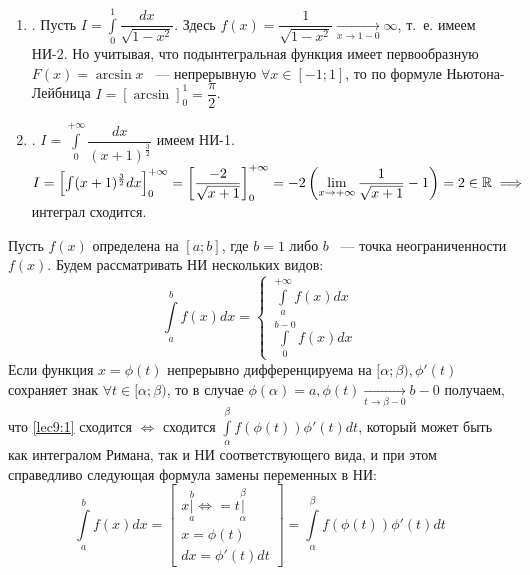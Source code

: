 \documentclass[../../main.tex]{subfiles}
\begin{document}
\begin{exmps}
\begin{enumerate}
	\item. Пусть $ I = \int\limits_{0}^1 \dfrac{dx}{\sqrt{1 - x^2}} $.
	Здесь $ f(x) = \dfrac{1}{\sqrt{1 - x^2}} \underset{x \to 1 - 0}{\to}
	\infty $, т.~е. имеем НИ-2. Но учитывая, что подынтегральная функция 
	имеет первообразную $ F(x) = \arcsin{x} $ ~--- непрерывную $ \forall x
	\in [-1; 1] $, то по формуле Ньютона-Лейбница $ 
	I = \left[\arcsin \right]_0^1 = \dfrac{\pi}{2} $.
	\item. $ I = \int\limits_{0}^{+\infty} \dfrac{dx}{(x + 1)^{\frac{3}{2}}}$
	имеем НИ-1. $ I = \left[ \int (x + 1)^{\frac{3}{2}} dx\right]_0^{+\infty} 
	= \left[ \dfrac{-2}{\sqrt{x + 1}} \right]_0^{+\infty} = -2 \left(
	\lim\limits_{x \to + \infty} \dfrac{1}{\sqrt{x + 1}} - 1 \right) = 2
	\in \mathbb{R} \implies $ интеграл сходится.
\end{enumerate}
\end{exmps}
\begin{thm}
	Пусть $ f(x) $ определена на $ [a; b] $, где $ b = 1 $ либо $ b $ ~---
	точка неограниченности $ f(x) $. %
	Будем рассматривать НИ нескольких видов:
	\begin{equation}
		\label{lec9:1}
		\int\limits_a^b f(x) dx = 
		\begin{cases}
			\int\limits_a^{+\infty} f(x) dx\\
			\int\limits_{0}^{b - 0} f(x) dx
		\end{cases}
	\end{equation}
	Если функция $ x = \phi(t) $ непрерывно дифференцируема на $ [\alpha; \beta)
	, \phi'(t) $ сохраняет знак $ \forall t \in [\alpha; \beta) $, то
	в случае $ \phi(\alpha) = a, \phi(t) \underset{t \to \beta - 0}{\to} b - 0
	$ получаем, что \eqref{lec9:1} сходится $\iff$ сходится
	$ \int\limits_\alpha^\beta f(\phi(t)) \phi'(t) dt $, который может быть как
	интегралом Римана, так и НИ соответствующего вида, и при этом справедливо 
	следующая формула замены переменных в НИ:
	\begin{equation}
		\label{lec9:2}
		\int\limits_a^b f(x) dx = 
		\begin{bmatrix}
			x|\limits_a^b \iff= t|\limits_\alpha^\beta\\
			x = \phi(t)\\
			dx = \phi'(t)dt
		\end{bmatrix} =
		\int\limits_\alpha^\beta f(\phi(t)) \phi'(t) dt
	\end{equation}
\end{thm}
\end{document}
